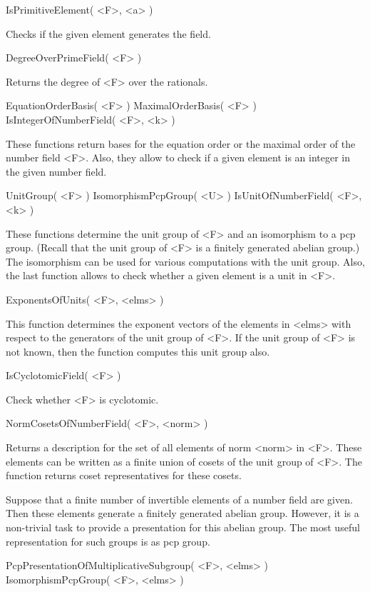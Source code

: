 \> IsPrimitiveElement( <F>, <a> )

Checks if the given element generates the field.

\> DegreeOverPrimeField( <F> )

Returns the degree of <F> over the rationals. 

\> EquationOrderBasis( <F> )
\> MaximalOrderBasis( <F> )
\> IsIntegerOfNumberField( <F>, <k> )

These functions return bases for the equation order or the maximal order
of the number field <F>. Also, they allow to check if a given element is
an integer in the given number field.

\> UnitGroup( <F> )
\> IsomorphismPcpGroup( <U> )
\> IsUnitOfNumberField( <F>, <k> )

These functions determine the unit group of <F> and an isomorphism to
a pcp group. (Recall that the unit group of <F> is a finitely generated 
abelian group.) The isomorphism can be used for various computations with
the unit group. Also, the last function allows to check whether a given
element is a unit in <F>. 

\> ExponentsOfUnits( <F>, <elms> )

This function determines the exponent vectors of the elements in <elms>
with respect to the generators of the unit group of <F>. If the unit
group of <F> is not known, then the function computes this unit group also.

\> IsCyclotomicField( <F> )

Check whether <F> is cyclotomic.

\> NormCosetsOfNumberField( <F>, <norm> )

Returns a description for the set of all elements of norm <norm> in <F>. 
These elements can be written as a finite union of cosets of the unit
group of <F>. The function returns coset representatives for these cosets.


Suppose that a finite number of
invertible elements
of a number field are given. Then these elements generate a finitely
generated abelian group. However, it is a non-trivial task to provide
a presentation for this abelian group. The most useful representation
for such groups is as pcp group.

\> PcpPresentationOfMultiplicativeSubgroup( <F>, <elms> )
\> IsomorphismPcpGroup( <F>, <elms> )

